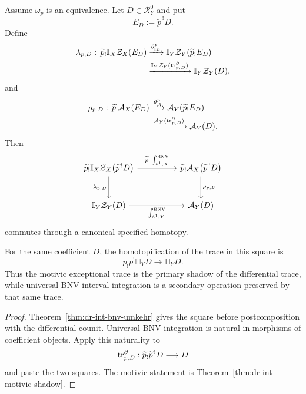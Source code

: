 \begin{theorem}
\label{thm:dr-int-trace-bnv}
Assume \(\omega_p\) is an equivalence.  Let \(D\in\mathcal R_Y^0\) and put
\[
    E_D:=\widetilde p^{\,!}D.
\]
Define
\[
\begin{aligned}
    \lambda_{p,D}:\,
    \widetilde p_!\mathbb I_X\mathcal Z_X(E_D)
    &\xrightarrow{\theta_{\mathbb I\mathcal Z}^p}
    \mathbb I_Y\mathcal Z_Y(\widetilde p_!E_D)
    \\
    &\xrightarrow{
        \mathbb I_Y\mathcal Z_Y(\operatorname{tr}^{\partial}_{p,D})
    }
    \mathbb I_Y\mathcal Z_Y(D),
\end{aligned}
\]
and
\[
\begin{aligned}
    \rho_{p,D}:\,
    \widetilde p_!\mathcal A_X(E_D)
    &\xrightarrow{\theta_{\mathcal A}^p}
    \mathcal A_Y(\widetilde p_!E_D)
    \\
    &\xrightarrow{
        \mathcal A_Y(\operatorname{tr}^{\partial}_{p,D})
    }
    \mathcal A_Y(D).
\end{aligned}
\]
Then
\[
\begin{tikzcd}[column sep=huge,row sep=large]
    \widetilde{p}_!
    \mathbb{I}_X\mathcal{Z}_X
    \bigl(\widetilde{p}^{\,!}D\bigr)
        \ar[r,"{\widetilde{p}_!\IntBNV_{\mathbb{A}^1,X}}"]
        \ar[d,"{\lambda_{p,D}}"']
    &
    \widetilde{p}_!
    \mathcal{A}_X
    \bigl(\widetilde{p}^{\,!}D\bigr)
        \ar[d,"{\rho_{p,D}}"]
    \\
    \mathbb{I}_Y\mathcal{Z}_Y(D)
        \ar[r,"{\IntBNV_{\mathbb{A}^1,Y}}"']
    &
    \mathcal{A}_Y(D)
\end{tikzcd}
\]
commutes through a canonical specified homotopy.

For the same coefficient \(D\), the homotopification of the trace in this
square is
\[
    p_!p^!\mathbb H_YD
    \longrightarrow
    \mathbb H_YD.
\]
Thus the motivic exceptional trace is the primary shadow of the differential
trace, while universal BNV interval integration is a secondary operation
preserved by that same trace.
\end{theorem}

\begin{proof}
Theorem~\ref{thm:dr-int-bnv-umkehr} gives the square before postcomposition
with the differential counit.  Universal BNV integration is natural in
morphisms of coefficient objects.  Apply this naturality to
\[
    \operatorname{tr}^{\partial}_{p,D}:
    \widetilde p_!\widetilde p^{\,!}D
    \longrightarrow
    D
\]
and paste the two squares.  The motivic statement is
Theorem~\ref{thm:dr-int-motivic-shadow}.
\end{proof}

